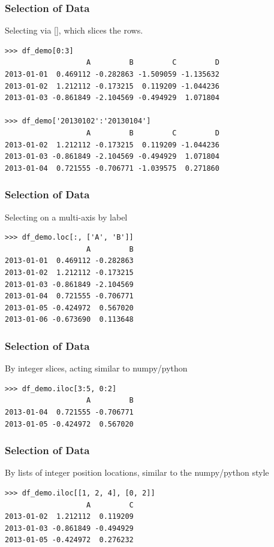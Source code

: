 \begin{frame}[fragile]\frametitle{Selection of Data}
Selecting via [], which slices the rows.
\begin{lstlisting}
>>> df_demo[0:3]
                   A         B         C         D
2013-01-01  0.469112 -0.282863 -1.509059 -1.135632
2013-01-02  1.212112 -0.173215  0.119209 -1.044236
2013-01-03 -0.861849 -2.104569 -0.494929  1.071804

>>> df_demo['20130102':'20130104']
                   A         B         C         D
2013-01-02  1.212112 -0.173215  0.119209 -1.044236
2013-01-03 -0.861849 -2.104569 -0.494929  1.071804
2013-01-04  0.721555 -0.706771 -1.039575  0.271860
\end{lstlisting}
\end{frame}

\begin{frame}[fragile]\frametitle{Selection of Data}
Selecting on a multi-axis by label
\begin{lstlisting}
>>> df_demo.loc[:, ['A', 'B']]
                   A         B
2013-01-01  0.469112 -0.282863
2013-01-02  1.212112 -0.173215
2013-01-03 -0.861849 -2.104569
2013-01-04  0.721555 -0.706771
2013-01-05 -0.424972  0.567020
2013-01-06 -0.673690  0.113648
\end{lstlisting}
\end{frame}

\begin{frame}[fragile]\frametitle{Selection of Data}
By integer slices, acting similar to numpy/python
\begin{lstlisting}
>>> df_demo.iloc[3:5, 0:2]
                   A         B
2013-01-04  0.721555 -0.706771
2013-01-05 -0.424972  0.567020
\end{lstlisting}
\end{frame}

\begin{frame}[fragile]\frametitle{Selection of Data}
By lists of integer position locations, similar to the numpy/python style
\begin{lstlisting}
>>> df_demo.iloc[[1, 2, 4], [0, 2]]
                   A         C
2013-01-02  1.212112  0.119209
2013-01-03 -0.861849 -0.494929
2013-01-05 -0.424972  0.276232
\end{lstlisting}
\end{frame}

